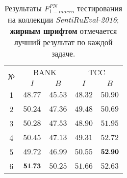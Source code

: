 \begin{table}[ht!]
\centering
\caption{Результаты $F_{1-macro}^{PN}$ тестирования на коллекции {\it SentiRuEval-2016};
        {\bf жирным шрифтом} отмечается лучший результат по каждой задаче.
        }
\label{table:results2016}
\begin{tabular}{ccccc}
\hline
\multicolumn{1}{c|}{\multirow{2}{*}{№}} & \multicolumn{2}{c|}{BANK} & \multicolumn{2}{c}{TCC}\\ \cline{2-5}
\multicolumn{1}{c|}{}                   & \multicolumn{1}{c|}{$I$} & \multicolumn{1}{c|}{$B$} & \multicolumn{1}{c|}{$I$} & $B$             \\ \hline
1                                       & ${48.77}$                              & $45.53$                              & $48.32$                             & $50.90$                    \\
2                                       & ${50.24}$                              & $47.36$                              & $49.48$                             & $50.69$                    \\
3                                       & ${50.28}$                              & $47.53$                              & $48.90$                             & $51.95$                    \\
4                                       & ${50.45}$                              & $47.13$                              & $49.31$                             & $52.72$                    \\
5                                       & ${49.72}$                              & $46.99$                              & $50.55$                             & $\bf{52.90}$               \\
6                                       & ${\bf 51.73}$                          & $50.25$                              & $51.66$                             & $52.63$                    \\ \hline
\end{tabular}
\end{table}
